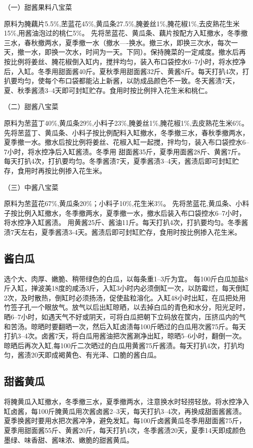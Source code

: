 \documentclass{ctexbook}
\begin{document}
（一）甜酱果料八宝菜

原料为腌藕片5.5\%,苤蓝花45\%,黄瓜条27.5\%,腌姜丝1\%,腌花椒1\%,去皮熟花生米15\%,用酱油泡过的桃仁5\%。
先将苤蓝花、黄瓜条、藕片按配方入缸撤水，冬季撤三水，春秋撤两水，夏季撤一水（撤水----换水。撤三水，即换三次水，每次一天，撤一水，即换一次水，时间为一天。下同）。保持腌菜的一定咸度。撤水后再按比例将姜丝、腌花椒倒入缸内，搅拌均匀，装入布口袋控水6--7小时，将水控净后，入缸。冬季用甜面酱40斤。夏秋季用甜面酱32斤、黄酱8斤。每天打扒4次，打扒要均匀，使每个布口袋都能沾上新酱，以防成品颜色不一致。冬天酱渍7天，夏、秋季酱渍3--4天即可封缸贮存。食用时按比例拌入花生米和桃仁。

（二）甜酱八宝菜

原料为苤蓝丁40\%,黄瓜条29\%,小料子23\%,腌姜丝1\%,腌花椒1\%,去皮熟花生米6\%。
先将苤蓝丁、黄瓜条、小料子按比例配料入缸撤水，冬季撤三水，春秋季撤两水，夏季撤一水。撤水后按比例将姜丝、花椒入缸一起搅，拌均匀，装入布口袋控水6--7小时，将水控净后入缸酱渍。冬季用
甜面酱35斤，夏季用面酱28斤、黄酱7斤。每天打扒4次，打扒要均匀。冬季酱渍7天，夏季酱渍3--4天，酱渍后即可封缸贮存，食用时再按比例掺入花生米。

（三）中酱八宝菜

原料为苤蓝花67\%,黄瓜条20\%；小料子10\%,花生米3\%。
先将苤蓝花,黄瓜条、小料子按比例入缸撤水，冬季撤两水，夏季撤一水，撤水后装入布口袋控水6--7小时，将水控净入缸酱渍。
用黄酱25斤、酱油11斤。每天打扒4次，打扒要均匀。冬季酱渍7天左右，夏季酱渍3-4天。酱渍后即可封缸贮存，食用时按比例掺入花生米。
\subsection{酱白瓜}
选个大、肉厚、嫩脆、稍带绿色的白瓜，以每条重1--3斤为宜。
每100斤白瓜加盐8斤入缸，掸波美18度的咸汤3斤，入缸3小时内必须倒缸一次，以防霉烂，每天倒缸2次，及时散热，倒缸时必须扬汤，促使盐粒溶化。入缸48小时出缸，在瓜把处用竹签子孔一个眼放气。放气以后出缸晾晒，以去掉白瓜的青色和水分，阳光足时，晒6--7小时，如遇天气不好或阴天，可将白瓜把朝下立码放在筐内，压挤瓜内的气和苦汤。晾晒时要翻晒一次，然后入缸卤渍每100斤晒过的白瓜用次酱75斤。每天打扒3--4次。卤酱7天，将白瓜用酱油把次酱涮净出缸，晾晒5--6小时，翻倒一次。晾晒后再次入缸,每100斤二次晒过的白瓜用黄酱75斤酱渍。每天打扒4次，打扒均匀，酱渍20天即成褐黄色、有光泽、口脆的酱白瓜。
\subsection{甜酱黄瓜}
将腌黄瓜入缸撤水，冬季撤三水，夏季撤两水，注意换水时轻捞轻放。将水控净入缸卤酱，每100斤腌黄瓜用次酱卤酱2--3天，每天打扒3--4次，再换成甜面酱酱渍。夏季换酱时要用水把次酱冲净，避免发缸。每100斤卤酱黄瓜冬季用甜面酱75斤，夏季用甜面酱55斤、黄酱20斤，每天打扒4次，冬季酱渍20天，夏季14天即成颜色墨绿、味香甜、酱味浓、嫩脆的甜酱黄瓜。
\end{document}
